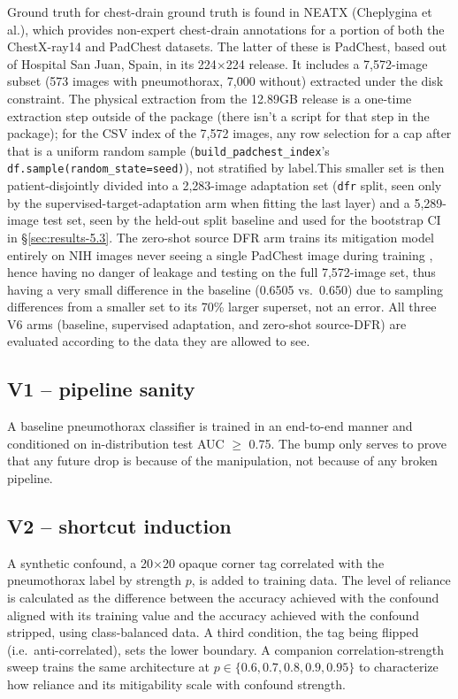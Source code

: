 \documentclass{ieeeaccess}
\begin{document}
Ground truth for chest-drain ground truth is found in NEATX (Cheplygina
et al.), which provides non-expert chest-drain annotations for a portion
of both the ChestX-ray14 and PadChest datasets. The latter of these is
PadChest, based out of Hospital San Juan, Spain, in its 224$\times$224
release. It includes a 7,572-image subset (573 images with pneumothorax,
7,000 without) extracted under the disk constraint. The physical extraction
from the 12.89GB release is a one-time extraction step outside of the
package (there isn't a script for that step in the package); for the CSV
index of the 7,572 images, any row selection for a cap after that is a
uniform random
sample (\texttt{build\_padchest\_index}'s \texttt{df.sample(random\_state=seed)}),
not stratified by label.This smaller set is then patient-disjointly divided into
a 2,283-image adaptation set (\texttt{dfr} split, seen only by the
supervised-target-adaptation arm when fitting the last layer) and a
5,289-image test set, seen by the held-out split baseline and used for the
bootstrap CI in \S\ref{sec:results-5.3}. The zero-shot source DFR arm trains
its mitigation model entirely on NIH images  never seeing a single PadChest
image during training , hence having no danger of leakage and testing on
the full 7,572-image set, thus having a very small difference in the baseline
(0.6505 vs.\ 0.650) due to sampling differences from a smaller set to its
70\% larger superset, not an error. All three V6 arms (baseline,
supervised adaptation, and zero-shot source-DFR) are evaluated according to the
data they are allowed to see.

\subsection{V1 -- pipeline sanity}
A baseline pneumothorax classifier is trained in an end-to-end manner and conditioned on in-distribution test AUC $\geq$ 0.75. The bump only serves to prove that any future drop is because of the manipulation, not because of any broken pipeline.

\subsection{V2 -- shortcut induction}
A synthetic confound, a 20$\times$20 opaque corner tag correlated with
the pneumothorax label by strength $p$, is added to training data.
The level of reliance is calculated as the difference between the
accuracy achieved with the confound aligned with its training value
and the accuracy achieved with the confound stripped, using class-balanced
data. A third condition, the tag being flipped (i.e.\ anti-correlated),
sets the lower boundary. A
companion correlation-strength sweep trains the same architecture at $p \in
\{0.6, 0.7, 0.8, 0.9, 0.95\}$ to characterize how reliance and its
mitigability scale with confound strength.
\end{document}
